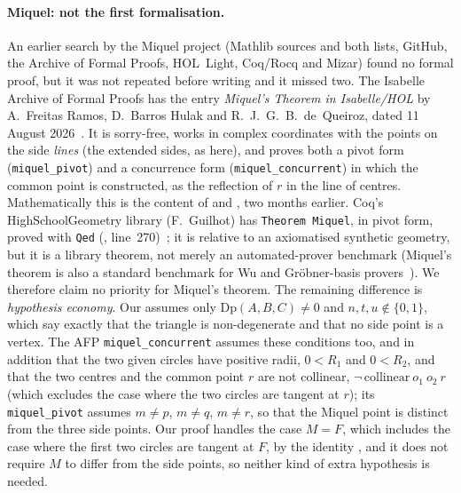 \documentclass[11pt]{article}
\theoremstyle{definition}
\theoremstyle{remark}
\newcommand{\lean}[1]{\texttt{#1}}
\begin{document}
\paragraph{Miquel: not the first formalisation.} An earlier search by the Miquel project (Mathlib
sources and both lists, GitHub, the Archive of Formal Proofs, HOL~Light, Coq/Rocq and Mizar) found
no formal proof, but it was not repeated before writing and it missed two. The Isabelle Archive of
Formal Proofs has the entry \emph{Miquel's Theorem in Isabelle/HOL} by A.~Freitas Ramos,
D.~Barros Hulak and R.~J.~G.~B.~de~Queiroz, dated 11 August 2026~\cite{AFPMiquel}. It is
sorry-free, works in complex coordinates with the points on the side \emph{lines} (the extended
sides, as here), and proves both a pivot form (\lean{miquel\_pivot}) and a concurrence form
(\lean{miquel\_concurrent}) in which the common point is constructed, as the reflection of $r$ in
the line of centres. Mathematically this is the content of  and
, two months earlier. Coq's HighSchoolGeometry library (F.~Guilhot)
has \lean{Theorem Miquel}, in pivot form, proved with \lean{Qed}
(, line~270)~\cite{HSG}; it is relative to an
axiomatised synthetic geometry, but it is a library theorem, not merely an automated-prover
benchmark (Miquel's theorem is also a standard benchmark for Wu and Gr\"obner-basis
provers~\cite{Chou}). We therefore claim no priority for Miquel's theorem. The remaining
difference is \emph{hypothesis economy}. Our  assumes only
$\mathrm{Dp}(A,B,C)\ne0$ and $n,t,u\notin\{0,1\}$, which say exactly that the triangle is
non-degenerate and that no side point is a vertex. The AFP \lean{miquel\_concurrent} assumes these
conditions too, and in addition that the two given circles have positive radii, $0<R_1$ and
$0<R_2$, and that the two centres and the common point $r$ are not collinear,
$\lnot\,\mathrm{collinear}\ o_1\ o_2\ r$ (which excludes the case where the two circles are
tangent at $r$); its \lean{miquel\_pivot} assumes $m\ne p$, $m\ne q$, $m\ne r$, so that the
Miquel point is distinct from the three side points. Our proof handles the case $M=F$, which includes
the case where the first two circles are tangent at $F$, by the identity , and
it does not require $M$ to differ from the side points, so neither kind of extra hypothesis is
needed.
\end{document}
